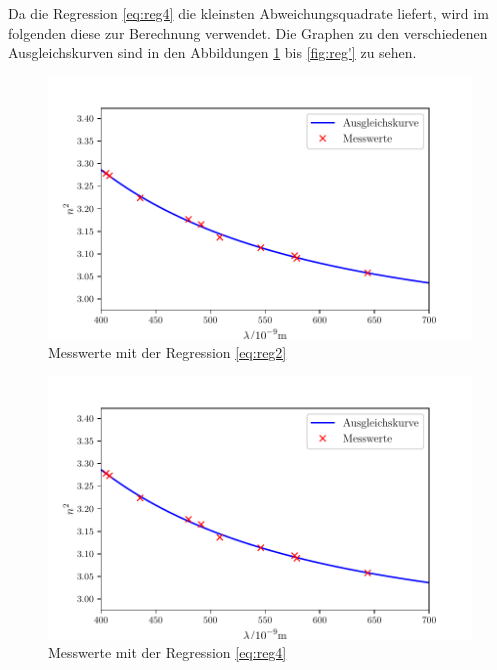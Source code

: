 \noindent Da die Regression \eqref{eq:reg4} die kleinsten Abweichungsquadrate liefert, wird im folgenden diese zur Berechnung verwendet.
Die Graphen zu den verschiedenen Ausgleichskurven sind in den Abbildungen \ref{fig:reg2} bis \ref{fig:reg'} zu sehen.

\begin{figure}
\centering

\includegraphics[width=\linewidth-70pt,height=\textheight-70pt,keepaspectratio]{content/images/Graph11.pdf}
\caption{Messwerte mit der Regression \eqref{eq:reg2}}
\label{fig:reg2}
\end{figure}

\begin{figure}
\centering
\includegraphics[width=\linewidth-70pt,height=\textheight-70pt,keepaspectratio]{content/images/Graph11.4.pdf}
\caption{Messwerte mit der Regression \eqref{eq:reg4}}
\end{figure}

